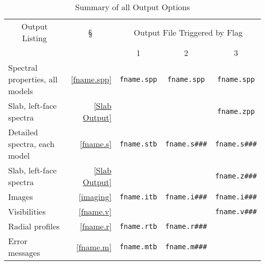 \documentclass[12pt]{article} \usepackage{epsf}
\let\q=\qquad
\begin{document}
\begin{table}[htbp]
\begin{center}
\renewcommand{\arraystretch}{1.3}

\caption{\hfil Summary of all Output Options}\label{Options Table}
\centerline{}
\renewcommand{\arraystretch}{1.3}
\begin{tabular}{|l|r||c|c|c|}                              \hline
 \multicolumn{1}{|c|}{Output Listing}  &
 \multicolumn{1}{c||}{\S}     &
 \multicolumn{3}{|c|}{Output File Triggered by Flag}  \\ \cline{3-5}
                  & & 1 & 2 & 3 \\ \hline
Spectral properties, all models  & \ref{fname.spp}
                                 & {\tt fname.spp}
                                 & {\tt fname.spp}
                                 & {\tt fname.spp}
                                 \\ \cline{1-2} \cline{5-5}
\q Slab, left-face spectra       & \ref{Slab Output}
                                 & & & {\tt fname.zpp}
                                 \\ \hline
Detailed spectra, each model     & \ref{fname.s}
                                 & {\tt fname.stb}
                                 & {\tt fname.s\#\#\#}
                                 & {\tt fname.s\#\#\#}
                                 \\ \cline{1-2} \cline{5-5}
\q Slab, left-face spectra       & \ref{Slab Output}
                                 & & & {\tt fname.z\#\#\#}
                                 \\ \hline
Images                           & \ref{imaging}
                                 & {\tt fname.itb}
                                 & {\tt fname.i\#\#\#}
                                 & {\tt fname.i\#\#\#}
                                 \\ \cline{1-2} \cline{5-5}
\q Visibilities                  & \ref{fname.v}
                                 &&& {\tt fname.v\#\#\#}  \\
                                 \hline
Radial profiles                  & \ref{fname.r}
                                 & {\tt fname.rtb}
                                 & {\tt fname.r\#\#\#}   &
                                 \\ \hline
Error messages                   & \ref{fname.m}
                                 & {\tt fname.mtb}
                                 & {\tt fname.m\#\#\#}   &
                                 \\ \hline
\end{tabular}
\end{center}
\end{table}
\end{document}
